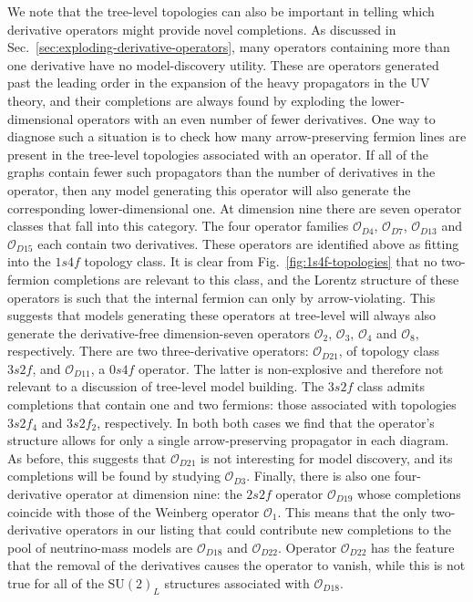 We note that the tree-level topologies can also be important in telling which
derivative operators might provide novel completions. As discussed in
Sec.~\ref{sec:exploding-derivative-operators}, many operators containing more
than one derivative have no model-discovery utility. These are operators
generated past the leading order in the expansion of the heavy propagators in
the UV theory, and their completions are always found by exploding the
lower-dimensional operators with an even number of fewer derivatives. One way to
diagnose such a situation is to check how many arrow-preserving fermion lines
are present in the tree-level topologies associated with an operator. If all of
the graphs contain fewer such propagators than the number of derivatives in the
operator, then any model generating this operator will also generate the
corresponding lower-dimensional one. At dimension nine there are seven operator
classes that fall into this category. The four operator families
$\mathcal{O}_{D4}$, $\mathcal{O}_{D7}$, $\mathcal{O}_{D13}$ and
$\mathcal{O}_{D15}$ each contain two derivatives. These operators are identified
above as fitting into the $1s4f$ topology class. It is clear from
Fig.~\ref{fig:1s4f-topologies} that no two-fermion completions are relevant to
this class, and the Lorentz structure of these operators is such that the
internal fermion can only by arrow-violating. This suggests that models
generating these operators at tree-level will always also generate the
derivative-free dimension-seven operators $\mathcal{O}_{2}$, $\mathcal{O}_{3}$,
$\mathcal{O}_{4}$ and $\mathcal{O}_{8}$, respectively. There are two
three-derivative operators: $\mathcal{O}_{D21}$, of topology class $3s2f$, and
$\mathcal{O}_{D11}$, a $0s4f$ operator. The latter is non-explosive and
therefore not relevant to a discussion of tree-level model building. The $3s2f$
class admits completions that contain one and two fermions: those associated
with topologies $3s2f_{4}$ and $3s2f_{2}$, respectively. In both both cases we
find that the operator's structure allows for only a single arrow-preserving
propagator in each diagram. As before, this suggests that $\mathcal{O}_{D21}$ is
not interesting for model discovery, and its completions will be found by
studying $\mathcal{O}_{D3}$. Finally, there is also one four-derivative operator
at dimension nine: the $2s2f$ operator $\mathcal{O}_{D19}$ whose completions
coincide with those of the Weinberg operator $\mathcal{O}_{1}$. This means that
the only two-derivative operators in our listing that could contribute new
completions to the pool of neutrino-mass models are $\mathcal{O}_{D18}$ and
$\mathcal{O}_{D22}$. Operator $\mathcal{O}_{D22}$ has the feature that the
removal of the derivatives causes the operator to vanish, while this is not true
for all of the $\mathrm{SU}(2)_{L}$ structures associated with
$\mathcal{O}_{D18}$.

